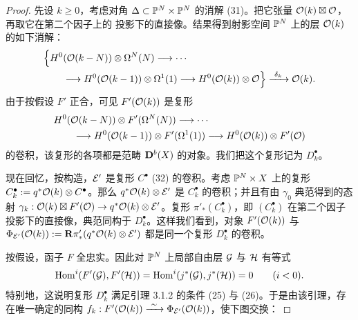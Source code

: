 \begin{proof}
先设 $k\geqslant0$，考虑对角 $\Delta\subset\mathbb{P}^{N}\times\mathbb{P}^{N}$ 的消解 (31)。把它张量 $\mathcal{O}(k)\boxtimes\mathcal{O}$，再取它在第二个因子上的
投影下的直接像。结果得到射影空间 $\mathbb{P}^{N}$ 上的层 $\mathcal{O}(k)$ 的如下消解：
\begin{equation*}
\begin{aligned}
&\Bigl\{H^{0}(\mathcal{O}(k-N))\otimes\Omega^{N}(N)\longrightarrow\cdots\\
&\qquad\longrightarrow H^{0}(\mathcal{O}(k-1))\otimes\Omega^{1}(1)\longrightarrow H^{0}(\mathcal{O}(k))\otimes\mathcal{O}\Bigr\}\xrightarrow{\ \delta_{k}\ }\mathcal{O}(k).
\end{aligned}
\end{equation*}
由于按假设 $F'$ 正合，可见 $F'(\mathcal{O}(k))$ 是复形
\begin{equation*}
\begin{aligned}
&H^{0}(\mathcal{O}(k-N))\otimes F'(\Omega^{N}(N))\longrightarrow\cdots\\
&\qquad\longrightarrow H^{0}(\mathcal{O}(k-1))\otimes F'(\Omega^{1}(1))\longrightarrow H^{0}(\mathcal{O}(k))\otimes F'(\mathcal{O})
\end{aligned}
\end{equation*}
的卷积，该复形的各项都是范畴 $\mathbf{D}^{b}(X)$ 的对象。我们把这个复形记为 $D^{\bullet}_{k}$。

现在回忆，按构造，$\mathcal{E}'$ 是复形 $C^{\bullet}$ (32) 的卷积。考虑 $\mathbb{P}^{N}\times X$ 上的复形 $C^{\bullet}_{k}:=q^{*}\mathcal{O}(k)\otimes C^{\bullet}$。那么 $q^{*}\mathcal{O}(k)\otimes\mathcal{E}'$ 是 $C^{\bullet}_{k}$ 的卷积；并且有由 $\gamma_{0}$ 典范得到的态射 $\gamma_{k}:\mathcal{O}(k)\boxtimes F'(\mathcal{O})\to q^{*}\mathcal{O}(k)\otimes\mathcal{E}'$。复形 $\pi'_{*}(C^{\bullet}_{k})$，即 $(C^{\bullet}_{k})$ 在第二个因子投影下的直接像，典范同构于 $D^{\bullet}_{k}$。这样我们看到，对象 $F'(\mathcal{O}(k))$ 与 $\Phi_{\mathcal{E}'}(\mathcal{O}(k)):=\mathbf{R}\pi'_{*}(q^{*}\mathcal{O}(k)\otimes\mathcal{E}')$ 都是同一个复形 $D^{\bullet}_{k}$ 的卷积。

按假设，函子 $F$ 全忠实。因此对 $\mathbb{P}^{N}$ 上局部自由层 $\mathcal{G}$ 与 $\mathcal{H}$ 有等式
\begin{equation*}
\operatorname{Hom}^{i}(F'(\mathcal{G}),F'(\mathcal{H}))=\operatorname{Hom}^{i}(j^{*}(\mathcal{G}),j^{*}(\mathcal{H}))=0\qquad(i<0).
\end{equation*}
特别地，这说明复形 $D^{\bullet}_{k}$ 满足引理 3.1.2 的条件 (25) 与 (26)。于是由该引理，存在唯一确定的同构 $f_{k}:F'(\mathcal{O}(k))\xrightarrow{\ \sim\ }\Phi_{\mathcal{E}'}(\mathcal{O}(k))$，使下图交换：


\end{proof}
